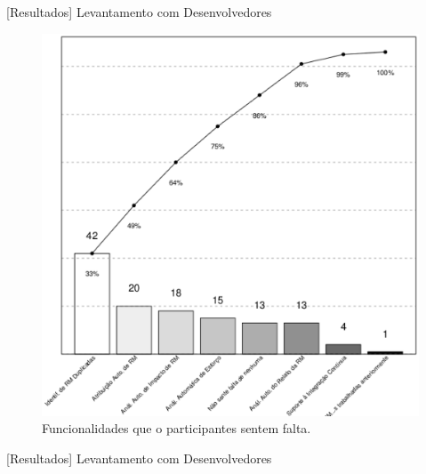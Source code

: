 \documentclass[t,14pt,mathserif]{beamer}
\begin{document}
\begin{frame}{[Resultados] Levantamento com Desenvolvedores}

\begin{figure}[htpb]
	\centering
	\includegraphics[width=0.5\linewidth]{../img/grafico_melhorias_fgrm_funcionalidades_faltantes.eps}
	\caption{Funcionalidades que o participantes sentem falta.}
\label{fig:grafico_melhorias_fgrm_funcionalidades_falantes}
\end{figure}

\end{frame}

\begin{frame}{[Resultados] Levantamento com Desenvolvedores}


\begin{table}[htpb]
\centering
{}
\caption{Classificação das funcionalidades que possam dar suporte ao uso das
metodologias dos agilistas.}
\label{tab:melhorias_fgrm_suporte_particas_ageis}

\end{table}

\end{frame}
\end{document}

